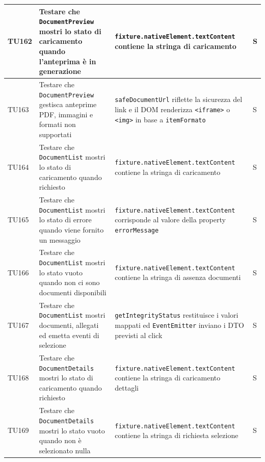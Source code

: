 \documentclass[a4paper,12pt]{article}
\begin{document}
\begin{longtable}{|M{1.2cm}|M{5cm}|M{8cm}|M{1.5cm}|}
            TU162 & Testare che \texttt{DocumentPreview} mostri lo stato di caricamento quando l'anteprima è in generazione & \texttt{fixture.nativeElement.textContent} contiene la stringa di caricamento & S \\ 
            \hline
            
            TU163 & Testare che \texttt{DocumentPreview} gestisca anteprime PDF, immagini e formati non supportati & \texttt{safeDocumentUrl} riflette la sicurezza del link e il DOM renderizza \texttt{<iframe>} o \texttt{<img>} in base a \texttt{itemFormato} & S \\ 
            \hline

            TU164 & Testare che \texttt{DocumentList} mostri lo stato di caricamento quando richiesto & \texttt{fixture.nativeElement.textContent} contiene la stringa di caricamento & S \\ 
            \hline
            
            TU165 & Testare che \texttt{DocumentList} mostri lo stato di errore quando viene fornito un messaggio & \texttt{fixture.nativeElement.textContent} corrisponde al valore della property \texttt{errorMessage} & S \\ 
            \hline
            
            TU166 & Testare che \texttt{DocumentList} mostri lo stato vuoto quando non ci sono documenti disponibili & \texttt{fixture.nativeElement.textContent} contiene la stringa di assenza documenti & S \\ 
            \hline
            
            TU167 & Testare che \texttt{DocumentList} mostri documenti, allegati ed emetta eventi di selezione & \texttt{getIntegrityStatus} restituisce i valori mappati ed \texttt{EventEmitter} inviano i DTO previsti al click & S \\ 
            \hline
            
            TU168 & Testare che \texttt{DocumentDetails} mostri lo stato di caricamento quando richiesto & \texttt{fixture.nativeElement.textContent} contiene la stringa di caricamento dettagli & S \\ 
            \hline
            
            TU169 & Testare che \texttt{DocumentDetails} mostri lo stato vuoto quando non è selezionato nulla & \texttt{fixture.nativeElement.textContent} contiene la stringa di richiesta selezione & S \\ 
            \hline
            

\end{longtable}
\end{document}
